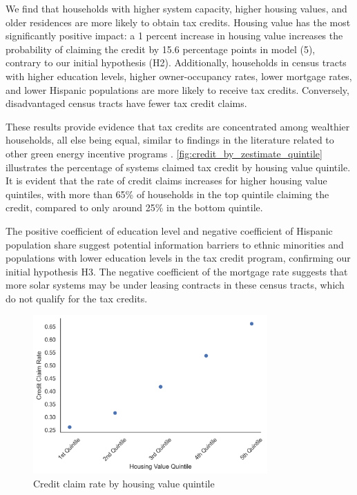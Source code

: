 \documentclass[11pt,twoside,letterpaper]{article}
\begin{document}
We find that households with higher system capacity, higher housing values, and older residences are more likely to obtain tax credits. Housing value has the most significantly positive impact: a 1 percent increase in housing value increases the probability of claiming the credit by 15.6  percentage points in model (5), contrary to our initial hypothesis (H2). Additionally, households in census tracts with higher education levels, higher owner-occupancy rates, lower mortgage rates, and lower Hispanic populations are more likely to receive tax credits. Conversely, disadvantaged census tracts have fewer tax credit claims.

These results provide evidence that tax credits are concentrated among wealthier households, all else being equal, similar to findings in the literature related to other green energy incentive programs \parencite{borenstein_distributional_2016}. \autoref{fig:credit_by_zestimate_quintile} illustrates the percentage of systems claimed tax credit by housing value quintile. It is evident that the rate of credit claims increases for higher housing value quintiles, with more than 65\% of households in the top quintile claiming the credit, compared to only around 25\% in the bottom quintile. 

The positive coefficient of education level and negative coefficient of Hispanic population share suggest potential information barriers to ethnic minorities and populations with lower education levels in the tax credit program, confirming our initial hypothesis H3. The negative coefficient of the mortgage rate suggests that more solar systems may be under leasing contracts in these census tracts, which do not qualify for the tax credits.

\begin{figure}[!ht]
    \centering
\includegraphics[width=0.8\textwidth]{figures/credit_by_zestimate_quintile.png}
    \caption{Credit claim rate by housing value quintile}
    \label{fig:credit_by_zestimate_quintile}
\end{figure}
\end{document}
